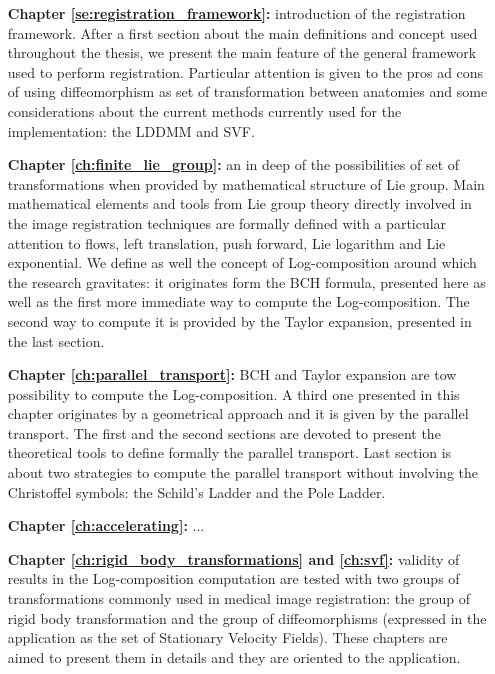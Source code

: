 \begin{enumerate}
	\item[{\bf Chapter \ref{se:registration_framework}:}] introduction of the registration framework. After a first section about the main definitions and concept used throughout the thesis, we present the main feature of the general framework used to perform registration. Particular attention is given to the pros ad cons of using diffeomorphism as set of transformation between anatomies and some considerations about the current methods currently used for the implementation: the LDDMM and SVF. 
	
	\item[{\bf Chapter \ref{ch:finite_lie_group}:}] an in deep of the possibilities of set of transformations when provided by mathematical structure of Lie group. Main mathematical elements and tools from Lie group theory directly involved in the image registration techniques are formally defined with a particular attention to flows, left translation, push forward, Lie logarithm and Lie exponential. We define as well the concept of Log-composition around which the research gravitates: it originates form the BCH formula, presented here as well as the first more immediate way to compute the Log-composition. The second way to compute it is provided by the Taylor expansion, presented in the last section.
	
	\item[{\bf Chapter \ref{ch:parallel_transport}:}] BCH and Taylor expansion are tow possibility to compute the Log-composition. A third one presented in this chapter originates by a geometrical approach and it is given by the parallel transport. The first and the second sections are devoted to present the theoretical tools to define formally the parallel transport. Last section is about two strategies to compute the parallel transport without involving the Christoffel symbols: the Schild's Ladder and the Pole Ladder.
	
	\item[{\bf Chapter \ref{ch:accelerating}:}] ...
	
	\item[{\bf Chapter \ref{ch:rigid_body_transformations} and \ref{ch:svf}:}] validity of results in the Log-composition computation are tested with two groups of transformations commonly used in medical image registration: the group of rigid body transformation and the group of diffeomorphisms (expressed in the application as the set of Stationary Velocity Fields). These chapters are aimed to present them in details and they are oriented to the application. 
	

\end{enumerate}
